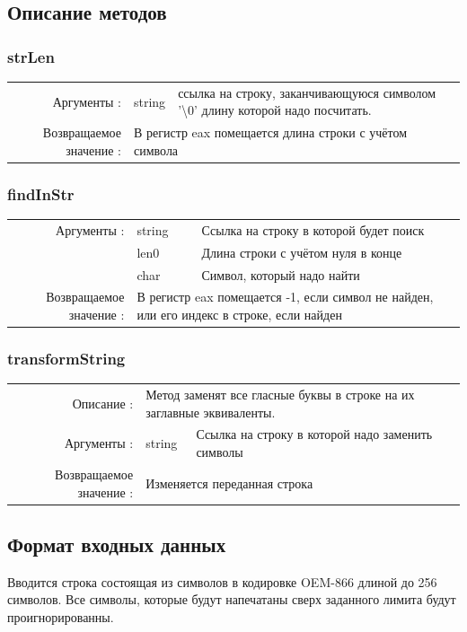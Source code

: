 \documentclass[14pt,a4paper]{article}
\begin{document}
    \subsection{Описание методов}
    \subsubsection{strLen}
    \par{
        \begin{tabular}{rlp{10cm}}
            Аргументы : & string  & ссылка на строку, заканчивающуюся символом '\textbackslash0' длину которой надо посчитать.\\
            Возвращаемое значение : & \multicolumn{2}{p{10cm}}{В регистр eax помещается длина строки с учётом символа}
        \end{tabular}
    }

    \subsubsection{findInStr}{
        \begin{tabular}{rlp{10cm}}
            Аргументы : & string  & Ссылка на строку в которой будет поиск\\
            \hfill & len0  & Длина строки с учётом нуля в конце \\
            \hfill & char & Символ, который надо найти\\
            Возвращаемое значение : & \multicolumn{2}{p{11cm}}{В регистр eax помещается -1, если символ не найден, или его индекс в строке, если найден}
        \end{tabular}
    }

    \subsubsection{transformString}{
        \begin{tabular}{rlp{11cm}}
            Описание : & \multicolumn{2}{p{10cm}}{Метод заменят все гласные буквы в строке на их заглавные эквиваленты.}\\
            Аргументы : & string  & Ссылка на строку в которой надо заменить символы\\
            Возвращаемое значение : & \multicolumn{2}{p{11cm}}{Изменяется переданная строка}
        \end{tabular}
    }

    \subsection{Формат входных данных}\par{
        Вводится строка состоящая из символов в кодировке OEM-866 длиной до 256 символов. Все символы, которые будут напечатаны сверх заданного лимита будут проигнорированны.
    }
\end{document}
